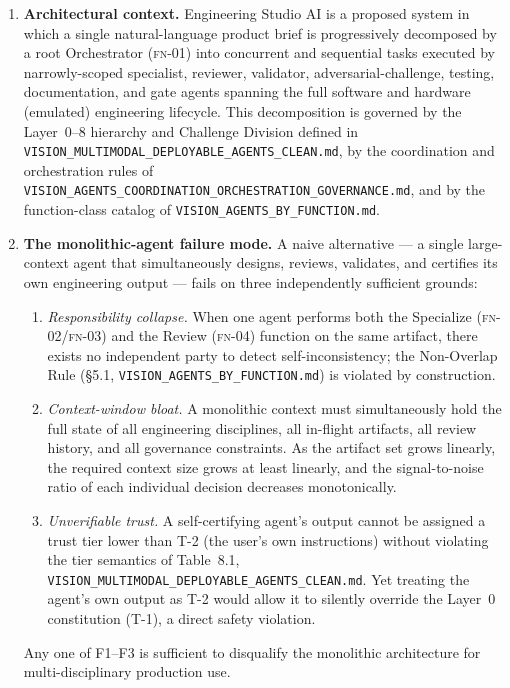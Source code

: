 \documentclass[12pt]{article}
\theoremstyle{definition}
\newcommand{\code}[1]{\texttt{#1}}
\newcommand{\FN}[1]{\textsc{fn-#1}}
\newcommand{\VisionClean}{\code{VISION\_MULTIMODAL\_\allowbreak DEPLOYABLE\_\allowbreak AGENTS\_CLEAN.md}}
\newcommand{\VisionGov}{\code{VISION\_AGENTS\_\allowbreak COORDINATION\_\allowbreak ORCHESTRATION\_\allowbreak GOVERNANCE.md}}
\newcommand{\VisionFunc}{\code{VISION\_AGENTS\_\allowbreak BY\_FUNCTION.md}}
\begin{document}
\begin{enumerate}

    \item \textbf{Architectural context.}
          Engineering Studio AI is a proposed system in which a single
          natural-language product brief is progressively decomposed by a
          root Orchestrator (\FN{01}) into concurrent and sequential tasks
          executed by narrowly-scoped specialist, reviewer, validator,
          adversarial-challenge, testing, documentation, and gate agents
          spanning the full software and hardware (emulated) engineering
          lifecycle.
          This decomposition is governed by the Layer~0--8 hierarchy and
          Challenge Division defined in \VisionClean{}, by the
          coordination and orchestration rules of \VisionGov{}, and by the
          function-class catalog of \VisionFunc{}.

    \item \textbf{The monolithic-agent failure mode.}
          A naive alternative --- a single large-context agent that
          simultaneously designs, reviews, validates, and certifies its own
          engineering output --- fails on three independently sufficient
          grounds:
          \begin{enumerate}
              \item[F1.] \emph{Responsibility collapse.}
                         When one agent performs both the Specialize
                         (\FN{02}/\FN{03}) and the Review (\FN{04}) function
                         on the same artifact, there exists no independent
                         party to detect self-inconsistency; the
                         Non-Overlap Rule (\S5.1, \VisionFunc{}) is
                         violated by construction.

              \item[F2.] \emph{Context-window bloat.}
                         A monolithic context must simultaneously hold the
                         full state of all engineering disciplines, all
                         in-flight artifacts, all review history, and all
                         governance constraints.
                         As the artifact set grows linearly, the required
                         context size grows at least linearly, and the
                         signal-to-noise ratio of each individual
                         decision decreases monotonically.

              \item[F3.] \emph{Unverifiable trust.}
                         A self-certifying agent's output cannot be
                         assigned a trust tier lower than T-2 (the user's
                         own instructions) without violating the tier
                         semantics of Table~8.1, \VisionClean{}.
                         Yet treating the agent's own output as T-2 would
                         allow it to silently override the Layer~0
                         constitution (T-1), a direct safety violation.
          \end{enumerate}
          Any one of F1--F3 is sufficient to disqualify the monolithic
          architecture for multi-disciplinary production use.


\end{enumerate}
\end{document}
